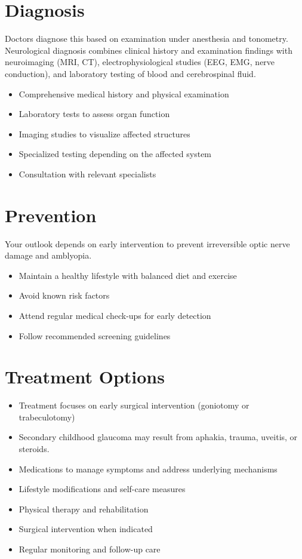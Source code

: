 \section{Diagnosis}
Doctors diagnose this based on examination under anesthesia and tonometry. Neurological diagnosis combines clinical history and examination findings with neuroimaging (MRI, CT), electrophysiological studies (EEG, EMG, nerve conduction), and laboratory testing of blood and cerebrospinal fluid.

\begin{itemize}[noitemsep]
  \item Comprehensive medical history and physical examination
  \item Laboratory tests to assess organ function
  \item Imaging studies to visualize affected structures
  \item Specialized testing depending on the affected system
  \item Consultation with relevant specialists
\end{itemize}
\section{Prevention}
Your outlook depends on early intervention to prevent irreversible optic nerve damage and amblyopia.

\begin{itemize}[noitemsep]
  \item Maintain a healthy lifestyle with balanced diet and exercise
  \item Avoid known risk factors
  \item Attend regular medical check-ups for early detection
  \item Follow recommended screening guidelines
\end{itemize}
\section{Treatment Options}
\begin{itemize}[noitemsep]
  \item Treatment focuses on early surgical intervention (goniotomy or trabeculotomy)
  \item Secondary childhood glaucoma may result from aphakia, trauma, uveitis, or steroids.
  \item Medications to manage symptoms and address underlying mechanisms
  \item Lifestyle modifications and self-care measures
  \item Physical therapy and rehabilitation
  \item Surgical intervention when indicated
  \item Regular monitoring and follow-up care
\end{itemize}

